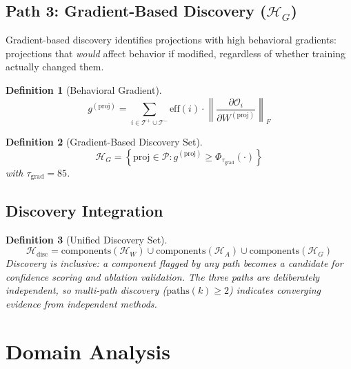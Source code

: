 \documentclass[11pt]{article}
\newtheorem{definition}{Definition}[section]
\begin{document}
\subsection{Path 3: Gradient-Based Discovery ($\mathcal{H}_G$)}

Gradient-based discovery identifies projections with high behavioral gradients: projections that \emph{would} affect behavior if modified, regardless of whether training actually changed them.

\begin{definition}[Behavioral Gradient]
\begin{equation}
g^{(\text{proj})} = \sum_{i \in \mathcal{T}^+ \cup \mathcal{T}^-} \text{eff}(i) \cdot \left\|\frac{\partial \mathcal{O}_i}{\partial W^{(\text{proj})}}\right\|_F
\end{equation}
\end{definition}

\begin{definition}[Gradient-Based Discovery Set]
\begin{equation}
\mathcal{H}_G = \left\{\text{proj} \in \mathcal{P} : g^{(\text{proj})} \geq \Phi_{\tau_{\text{grad}}}(\cdot)\right\}
\end{equation}
with $\tau_{\text{grad}} = 85$.
\end{definition}

\subsection{Discovery Integration}

\begin{definition}[Unified Discovery Set]
\begin{equation}
\mathcal{H}_{\text{disc}} = \text{components}(\mathcal{H}_W) \cup \text{components}(\mathcal{H}_A) \cup \text{components}(\mathcal{H}_G)
\end{equation}
Discovery is inclusive: a component flagged by \emph{any} path becomes a candidate for confidence scoring and ablation validation. The three paths are deliberately independent, so multi-path discovery ($\text{paths}(k) \geq 2$) indicates converging evidence from independent methods.
\end{definition}


\section{Domain Analysis}
\label{sec:weight}
\end{document}
